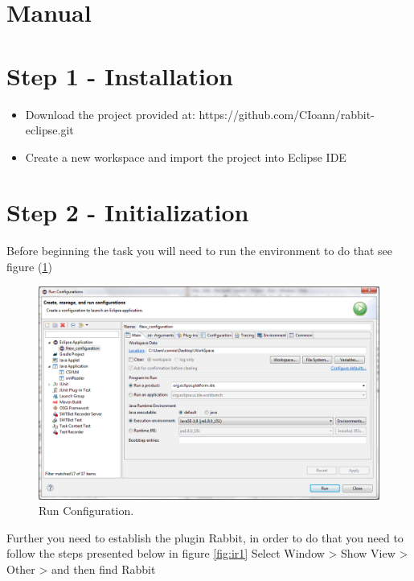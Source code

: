 \section{Manual}


\section{Step 1 - Installation}

\begin{itemize}
	\item Download the project provided at: https://github.com/CIoann/rabbit-eclipse.git
	\item Create a new workspace and import the project into Eclipse IDE
\end{itemize}

\section{Step 2 - Initialization} 
Before beginning the task you will need to run the environment to do that see figure (\ref{fig:rc})

\begin{figure}[!ht]
		\begin{center}		 	
			\includegraphics[width=\textwidth]{figures/runconfig.png}
		\end{center}
		\caption{Run Configuration.}
		\label{fig:rc}
	\end{figure}

Further you need to establish the plugin Rabbit, in order to do that you need to follow the steps presented below in figure \ref{fig:ir1} Select Window > Show View > Other > and then find Rabbit

